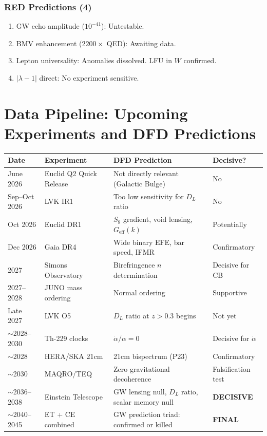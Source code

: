\documentclass[11pt,a4paper]{article}
\begin{document}
\section{RED Predictions (4)}

\begin{enumerate}
\item GW echo amplitude ($10^{-41}$): Untestable.
\item BMV enhancement ($2200\times$ QED): Awaiting data.
\item Lepton universality: Anomalies dissolved. LFU in $W$ confirmed.
\item $|\lambda-1|$ direct: No experiment sensitive.
\end{enumerate}


\part{Data Pipeline: Upcoming Experiments and DFD Predictions}
\label{part:datapipeline}

\begin{center}
\begin{longtable}{llp{6cm}l}
\toprule
\textbf{Date} & \textbf{Experiment} & \textbf{DFD Prediction} & \textbf{Decisive?} \\
\midrule
\endfirsthead
June 2026 & Euclid Q2 Quick Release & Not directly relevant (Galactic Bulge) & No \\
Sep--Oct 2026 & LVK IR1 & Too low sensitivity for $D_L$ ratio & No \\
Oct 2026 & Euclid DR1 & $S_8$ gradient, void lensing, $G_\text{eff}(k)$ & Potentially \\
Dec 2026 & Gaia DR4 & Wide binary EFE, bar speed, IFMR & Confirmatory \\
2027 & Simons Observatory & Birefringence $n$ determination & Decisive for CB \\
2027--2028 & JUNO mass ordering & Normal ordering & Supportive \\
Late 2027 & LVK O5 & $D_L$ ratio at $z > 0.3$ begins & Not yet \\
$\sim$2028--2030 & Th-229 clocks & $\dot{\alpha}/\alpha = 0$ & Decisive for $\dot{\alpha}$ \\
$\sim$2028 & HERA/SKA 21cm & 21cm bispectrum (P23) & Confirmatory \\
$\sim$2030 & MAQRO/TEQ & Zero gravitational decoherence & Falsification test \\
$\sim$2036--2038 & Einstein Telescope & GW lensing null, $D_L$ ratio, scalar memory null & \textbf{DECISIVE} \\
$\sim$2040--2045 & ET + CE combined & GW prediction triad: confirmed or killed & \textbf{FINAL} \\
\bottomrule
\end{longtable}
\end{center}
\end{document}
